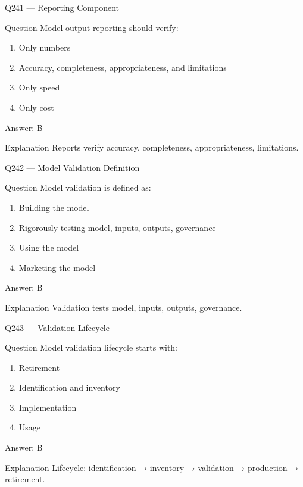 \documentclass[aspectratio=169,8pt]{beamer}
\begin{document}
\begin{frame}{Q241 --- Reporting Component}
\begin{block}{Question}
Model output reporting should verify:
\begin{enumerate}
\item Only numbers
\item Accuracy, completeness, appropriateness, and limitations
\item Only speed
\item Only cost
\end{enumerate}
\end{block}
\begin{exampleblock}{Answer: B}\end{exampleblock}
\begin{block}{Explanation}
Reports verify accuracy, completeness, appropriateness, limitations.
\end{block}
\end{frame}

\begin{frame}{Q242 --- Model Validation Definition}
\begin{block}{Question}
Model validation is defined as:
\begin{enumerate}
\item Building the model
\item Rigorously testing model, inputs, outputs, governance
\item Using the model
\item Marketing the model
\end{enumerate}
\end{block}
\begin{exampleblock}{Answer: B}\end{exampleblock}
\begin{block}{Explanation}
Validation tests model, inputs, outputs, governance.
\end{block}
\end{frame}

\begin{frame}{Q243 --- Validation Lifecycle}
\begin{block}{Question}
Model validation lifecycle starts with:
\begin{enumerate}
\item Retirement
\item Identification and inventory
\item Implementation
\item Usage
\end{enumerate}
\end{block}
\begin{exampleblock}{Answer: B}\end{exampleblock}
\begin{block}{Explanation}
Lifecycle: identification → inventory → validation → production → retirement.
\end{block}
\end{frame}
\end{document}
